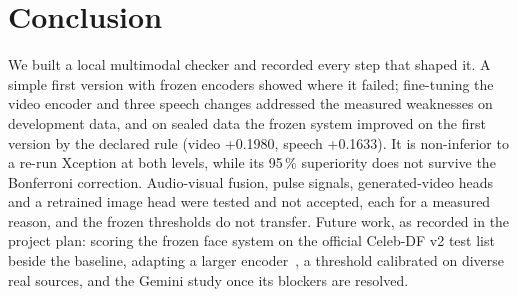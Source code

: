 \documentclass[conference,a4paper]{IEEEtran_nodash}
\begin{document}
\section{Conclusion}\label{sec:concl}
We built a local multimodal checker and recorded every step that shaped it. A
simple first version with frozen encoders showed where it failed; fine-tuning the
video encoder and three speech changes addressed the measured weaknesses on
development data, and on sealed data the frozen system improved on the first
version by the declared rule (video +0.1980, speech +0.1633). It is non-inferior
to a re-run Xception at both levels, while its 95\,\% superiority does not survive
the Bonferroni correction. Audio-visual fusion, pulse signals, generated-video
heads and a retrained image head were tested and not accepted, each for a measured
reason, and the frozen thresholds do not transfer. Future work, as recorded in the
project plan: scoring the frozen face system on the official Celeb-DF v2 test list
beside the baseline, adapting a larger encoder~\cite{hu2022lora}, a threshold
calibrated on diverse real sources, and the Gemini study once its blockers are
resolved.



\end{document}
